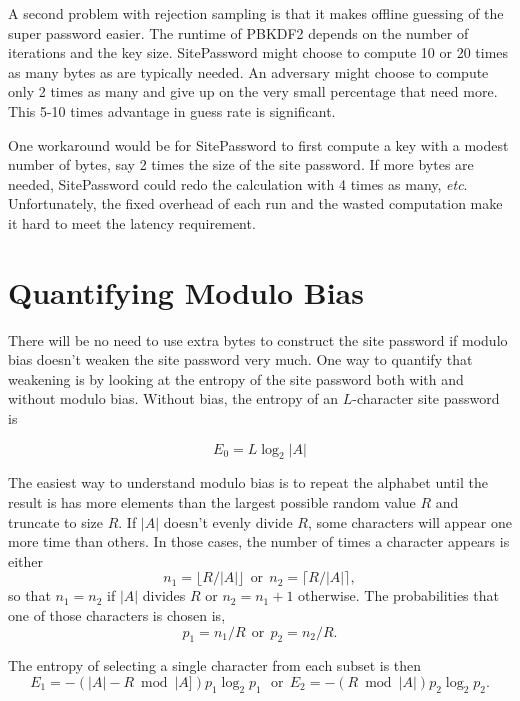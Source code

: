 \documentclass[11pt, oneside]{article}   	%
\begin{document}
A second problem with rejection sampling is that it makes offline guessing of the super password easier.  The runtime of PBKDF2 depends on the number of iterations and the key size.  SitePassword might choose to compute 10 or 20 times as many bytes as are typically needed.  An adversary might choose to compute only 2 times as many and give up on the very small percentage that need more.  This 5-10 times advantage in guess rate is significant.

One workaround would be for SitePassword to first compute a key with a modest number of bytes, say 2 times the size of the site password.  If more bytes are needed, SitePassword could redo the calculation with 4 times as many, {\em etc}.  Unfortunately, the fixed overhead of each run and the wasted computation make it hard to meet the latency requirement.

\section{Quantifying Modulo Bias}

There will be no need to use extra bytes to construct the site password if modulo bias doesn't weaken the site password very much.  One way to quantify that weakening is by looking at the entropy of the site password both with and without modulo bias.  Without bias, the entropy of an $L$-character site password is 

\begin{equation}
E_0 = L \log_2 |A|
\end{equation}

The easiest way to understand modulo bias is to repeat the alphabet until the result is has more elements than the largest possible random value $R$ and truncate to size $R$.  If $|A|$ doesn't evenly divide $R$, some characters will appear one more time than others.  In those cases, the number of times a character appears is either
\begin{equation}
n_1 = \lfloor R/|A| \rfloor ~~\textrm{or}~~ n_2 = \lceil R/|A| \rceil,
\end{equation}
so that $n_1 = n_2$ if $|A|$ divides $R$ or $n_2 = n_1 + 1$ otherwise.  The probabilities that one of those characters is chosen is, 
\begin{equation}
p_1 = n_1/R ~~\textrm{or}~~ p_2 = n_2/R.
\end{equation}

The entropy of selecting a single character from each subset is then
\begin{equation}
E_1 = -(|A| - R \bmod |A]) p_1 \log_2 p_1 ~~~\textrm{or}~~ E_2 = - (R \bmod |A|) p_2 \log_2 p_2.
\end{equation}
\end{document}
